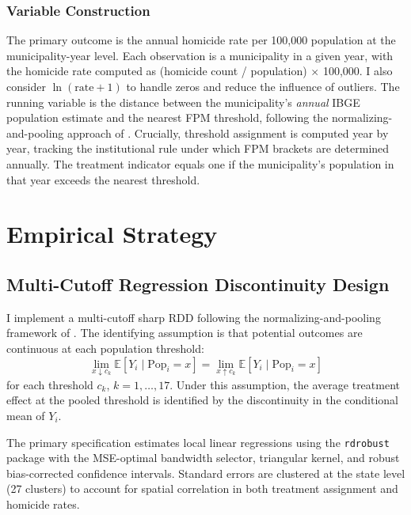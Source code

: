 \documentclass[12pt]{article}
\newcommand{\E}{\mathbb{E}}
\begin{document}
\subsubsection*{Variable Construction} The primary outcome is the annual homicide rate per 100,000 population at the municipality-year level. Each observation is a municipality in a given year, with the homicide rate computed as (homicide count / population) $\times$ 100,000. I also consider $\ln(\text{rate} + 1)$ to handle zeros and reduce the influence of outliers. The running variable is the distance between the municipality's \textit{annual} IBGE population estimate and the nearest FPM threshold, following the normalizing-and-pooling approach of \citet{cattaneo2016interpreting}. Crucially, threshold assignment is computed year by year, tracking the institutional rule under which FPM brackets are determined annually. The treatment indicator equals one if the municipality's population in that year exceeds the nearest threshold.



\section{Empirical Strategy}

\subsection{Multi-Cutoff Regression Discontinuity Design}

I implement a multi-cutoff sharp RDD following the normalizing-and-pooling framework of \citet{cattaneo2016interpreting}. The identifying assumption is that potential outcomes are continuous at each population threshold:
\begin{equation}
\lim_{x \downarrow c_k} \E[Y_i \mid \text{Pop}_i = x] = \lim_{x \uparrow c_k} \E[Y_i \mid \text{Pop}_i = x]
\end{equation}
for each threshold $c_k$, $k = 1, \ldots, 17$. Under this assumption, the average treatment effect at the pooled threshold is identified by the discontinuity in the conditional mean of $Y_i$.

The primary specification estimates local linear regressions using the \texttt{rdrobust} package \citep{cattaneo2020practical} with the MSE-optimal bandwidth selector, triangular kernel, and robust bias-corrected confidence intervals. Standard errors are clustered at the state level (27 clusters) to account for spatial correlation in both treatment assignment and homicide rates.
\end{document}
